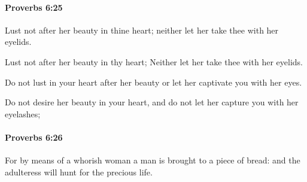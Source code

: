 		\paragraph{Proverbs 6:25} %
			\label{PROVERBS-6-25}

			Lust not after her beauty in thine heart; neither let her take thee with her eyelids.

			\begin{versebox}
					\item[BHS] 
					\item[ASV] Lust not after her beauty in thy heart; Neither let her take thee with her eyelids.
					\item[NIV] Do not lust in your heart after her beauty or let her captivate you with her eyes.
					\item[NRSV] Do not desire her beauty in your heart, and do not let her capture you with her eyelashes;
			\end{versebox}

		\paragraph{Proverbs 6:26} %
			\label{PROVERBS-6-26}

			For by means of a whorish woman a man is brought to a piece of bread: and the adulteress will hunt for the precious life.

